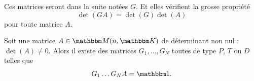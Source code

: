 Ces matrices seront dans la suite notées \( G\). Et elles vérifient la grosse propriété
\begin{equation}        \label{EQooLQTVooBYjVYl}
    \det(GA)=\det(G)\det(A)
\end{equation}
pour toute matrice \( A\).

\begin{proposition}        \label{PROPooJBTZooNLobpf}
    Soit une matrice \( A\in \eM(n,\eK)\) de déterminant non nul : \( \det(A)\neq 0\). Alors il existe des matrices \( G_1,\ldots, G_N\) toutes de type \( P\), \( T \) ou \( D\) telles que
    \begin{equation}
        G_1\ldots G_NA=\mtu.
    \end{equation}
\end{proposition}

